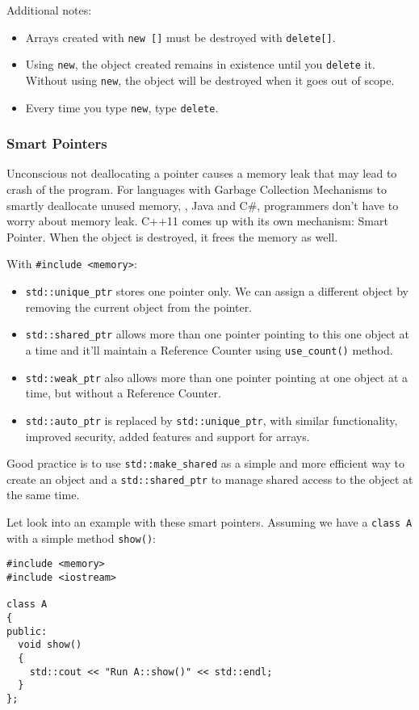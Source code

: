 Additional notes:
\begin{itemize}
	\setlength\itemsep{0em}
	\item Arrays created with \verb|new []| must be destroyed with \verb|delete[]|.
	\item Using \verb|new|, the object created remains in existence until you \verb|delete| it. Without using \verb|new|, the object will be destroyed when it goes out of scope.
	\item Every time you type \verb|new|, type \verb|delete|.
\end{itemize}

\subsubsection{Smart Pointers}

Unconscious not deallocating a pointer causes a memory leak that may lead to crash of the program. For languages with Garbage Collection Mechanisms to smartly deallocate unused memory, \eg, Java and C\#, programmers don't have to worry about memory leak. C++11 comes up with its own mechanism: Smart Pointer. When the object is destroyed, it frees the memory as well.

With \verb|#include <memory>|:
\begin{itemize}
	\setlength\itemsep{0em}
	\item \verb|std::unique_ptr| stores one pointer only. We can assign a different object by removing the current object from the pointer.
	\item \verb|std::shared_ptr| allows more than one pointer pointing to this one object at a time and it’ll maintain a Reference Counter using \verb|use_count()| method.
	\item \verb|std::weak_ptr| also allows more than one pointer pointing at one object at a time, but without a Reference Counter.
	\item \verb|std::auto_ptr| is replaced by \verb|std::unique_ptr|, with similar functionality, improved security, added features and support for arrays.
\end{itemize}

Good practice is to use \verb|std::make_shared| as a simple and more efficient way to create an object and a \verb|std::shared_ptr| to manage shared access to the object at the same time.

Let look into an example with these smart pointers. Assuming we have a \texttt{class A} with a simple method \texttt{show()}:
\begin{verbatim}
#include <memory>
#include <iostream>

class A
{
public:
  void show()
  {
    std::cout << "Run A::show()" << std::endl;
  }
};
\end{verbatim}

